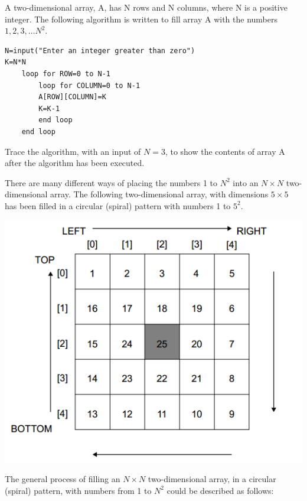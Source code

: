 \begin{exercise*}%
A two-dimensional array, A, has N rows and N columns, where N is a positive integer.
The following algorithm is written to fill array A with the numbers $1, 2, 3,\ldots N^2$.
\begin{verbatim}
N=input("Enter an integer greater than zero")
K=N*N
	loop for ROW=0 to N-1
		loop for COLUMN=0 to N-1
		A[ROW][COLUMN]=K
		K=K-1
		end loop
	end loop
\end{verbatim}
\begin{parts}
\item Trace the algorithm, with an input of $N=3$, to show the contents of array A after the algorithm has been executed.
\end{parts}
There are many different ways of placing the numbers 1 to $N^2$ into an $N \times N$ two-dimensional array. 
The following two-dimensional array, with dimensions $5 \times 5$ has been filled in a circular (spiral) pattern with numbers 1 to $5^2$.

\includegraphics[scale=0.6]{topic_4_intro_programming/topic_4_exercises/array}
\newline

The general process of filling an $N \times N$ two-dimensional array, in a circular (spiral) pattern, with numbers from 1 to $N^2$ could be described as follows:


\end{exercise*}
